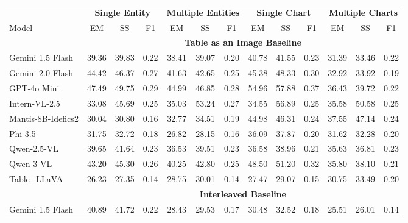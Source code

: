 \documentclass[11pt]{article}
\begin{document}
\begin{table}[t]
\vspace{-0.5em}
\scriptsize
\centering
\setlength{\aboverulesep}{0pt}
\setlength{\belowrulesep}{0pt}
\setlength{\tabcolsep}{8.5pt}
\begin{tabular}{lccc|ccc|ccc|ccc}
\toprule
\multicolumn{1}{c}{} & \multicolumn{3}{c|}{\textbf{Single Entity}} & \multicolumn{3}{c|}{\textbf{Multiple Entities}} & \multicolumn{3}{c|}{\textbf{Single Chart}} & \multicolumn{3}{c}{\textbf{Multiple Charts}} \\
\cmidrule{2-13}
Model & EM & SS & F1 & EM & SS & F1 & EM & SS & F1 & EM & SS & F1 \\
\cmidrule{2-13}
& \multicolumn{12}{c}{\textbf{Table as an Image Baseline}} \\
\cmidrule{1-13}
 Gemini 1.5 Flash     & 39.36 & 39.83 & 0.22 & 38.41 & 39.07 & 0.20 & 40.78 & 41.55 & 0.23 & 31.39 & 33.46 & 0.22 \\
 Gemini 2.0 Flash     & 44.42 & 46.37 & 0.27 & 41.63 & 42.65 & 0.25 & 45.38 & 48.33 & 0.30 & 32.92 & 33.92 & 0.19 \\
 GPT-4o Mini          & \cellcolor{yellow}47.49 & \cellcolor{yellow}49.75 & \cellcolor{yellow}0.29 & \cellcolor{yellow}44.99 & \cellcolor{yellow}46.85 & \cellcolor{yellow}0.28 & \cellcolor{yellow}54.96 & \cellcolor{yellow}57.88 & \cellcolor{yellow}0.37 & \cellcolor{yellow}36.43 & \cellcolor{yellow}39.72 & \cellcolor{yellow}0.22 \\
 Intern-VL-2.5        & 33.08 & 45.69 & 0.25 & 35.03 & 53.24 & 0.27 & 34.55 & 56.89 & 0.25 & 35.58 & 50.58 & 0.25 \\
 Mantis-8B-Idefics2   & 30.04 & 30.80 & 0.16 & 32.77 & 34.51 & 0.19 & 44.98 & 46.31 & 0.24 & 37.55 & 47.14 & 0.24 \\
 Phi-3.5              & 31.75 & 32.72 & 0.18 & 26.82 & 28.15 & 0.16 & 36.09 & 37.87 & 0.20 & 31.62 & 32.28 & 0.20 \\
 Qwen-2.5-VL          & 39.65 & 41.64 & 0.23 & 36.53 & 39.51 & 0.23 & 36.58 & 38.96 & 0.21 & 35.63 & 36.81 & 0.23 \\
 Qwen-3-VL            & 43.20 & 45.30 & 0.26 & 40.25 & 42.80 & 0.25 & 48.50 & 51.20 & 0.32 & 35.80 & 38.10 & 0.21 \\
 Table\_LLaVA         & 26.23 & 27.35 & 0.14 & 28.75 & 30.01 & 0.14 & 27.47 & 29.07 & 0.15 & 30.75 & 33.49 & 0.20 \\
\cmidrule{2-13}
& \multicolumn{12}{c}{\textbf{Interleaved Baseline}} \\
\cmidrule{2-13}
 Gemini 1.5 Flash     & 40.89 & 41.72 & 0.22 & 28.43 & 29.53 & 0.17 & 30.48 & 32.52 & 0.18 & 25.51 & 26.01 & 0.14 \\

\end{tabular}
\end{table}
\end{document}
